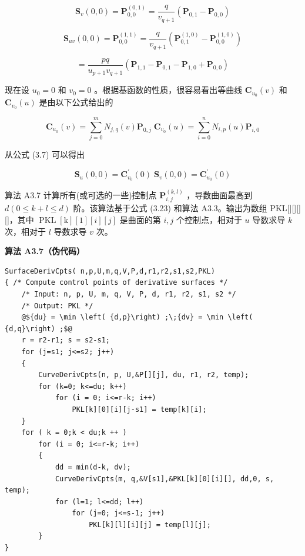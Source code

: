 \documentclass[../main.tex]{subfiles}
\begin{document}
\[
{\mathbf{S}}_{v}\left( {0,0}\right)  = {\mathbf{P}}_{0,0}^{\left( 0,1\right) } = \frac{q}{{v}_{q + 1}}\left( {{\mathbf{P}}_{0,1} - {\mathbf{P}}_{0,0}}\right)  \tag{3.24}
\]

\[
{\mathbf{S}}_{uv}\left( {0,0}\right)  = {\mathbf{P}}_{0,0}^{\left( 1,1\right) } = \frac{q}{{v}_{q + 1}}\left( {{\mathbf{P}}_{0,1}^{\left( 1,0\right) } - {\mathbf{P}}_{0,0}^{\left( 1,0\right) }}\right)
\]

\[
= \frac{pq}{{u}_{p + 1}{v}_{q + 1}}\left( {{\mathbf{P}}_{1,1} - {\mathbf{P}}_{0,1} - {\mathbf{P}}_{1,0} + {\mathbf{P}}_{0,0}}\right)
\]

现在设 \({u}_{0} = 0\) 和 \({v}_{0} = 0\) 。根据基函数的性质，很容易看出等曲线 \({\mathbf{C}}_{{u}_{0}}\left( v\right)\) 和 \({\mathbf{C}}_{{v}_{0}}\left( u\right)\) 是由以下公式给出的

\[
{\mathbf{C}}_{{u}_{0}}\left( v\right)  = \mathop{\sum }\limits_{{j = 0}}^{m}{N}_{j,q}\left( v\right) {\mathbf{P}}_{0,j}\;{\mathbf{C}}_{{v}_{0}}\left( u\right)  = \mathop{\sum }\limits_{{i = 0}}^{n}{N}_{i,p}\left( u\right) {\mathbf{P}}_{i,0}
\]

从公式 (3.7) 可以得出

\[
{\mathbf{S}}_{u}\left( {0,0}\right)  = {\mathbf{C}}_{{v}_{0}}^{\prime }\left( 0\right) \;{\mathbf{S}}_{v}\left( {0,0}\right)  = {\mathbf{C}}_{{u}_{0}}^{\prime }\left( 0\right)
\]

算法 A3.7 计算所有(或可选的一些)控制点 \({\mathbf{P}}_{i,j}^{\left( k,l\right) }\) ，导数曲面最高到 \(d\left( {0 \leq  k + l \leq  d}\right)\) 阶。该算法基于公式 (3.23) 和算法 A3.3。输出为数组 PKL[][][][]，其中 \(\operatorname{PKL}\left\lbrack  \mathrm{k}\right\rbrack  \left\lbrack  1\right\rbrack  \left\lbrack  i\right\rbrack  \left\lbrack  j\right\rbrack\) 是曲面的第 \(i,j\) 个控制点，相对于 \(u\) 导数求导 \(k\) 次，相对于 \(l\) 导数求导 \(v\) 次。

\par\medskip\noindent\textbf{算法 A3.7（伪代码）}\par
\begin{verbatim}
SurfaceDerivCpts( n,p,U,m,q,V,P,d,r1,r2,s1,s2,PKL)
{ /* Compute control points of derivative surfaces */
    /* Input: n, p, U, m, q, V, P, d, r1, r2, s1, s2 */
    /* Output: PKL */
    @${du} = \min \left( {d,p}\right) ;\;{dv} = \min \left( {d,q}\right) ;$@
    r = r2-r1; s = s2-s1;
    for (j=s1; j<=s2; j++)
    {
        CurveDerivCpts(n, p, U,&P[][j], du, r1, r2, temp);
        for (k=0; k<=du; k++)
            for (i = 0; i<=r-k; i++)
                PKL[k][0][i][j-s1] = temp[k][i];
    }
    for ( k = 0;k < du;k ++ )
        for (i = 0; i<=r-k; i++)
        {
            dd = min(d-k, dv);
            CurveDerivCpts(m, q,&V[s1],&PKL[k][0][i][], dd,0, s, temp);
            for (l=1; l<=dd; l++)
                for (j=0; j<=s-1; j++)
                    PKL[k][l][i][j] = temp[l][j];
        }
}
\end{verbatim}
\end{document}
